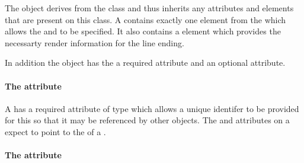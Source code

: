 The \LineEnding object derives from the \GraphicalPrimitiveTwoD class
and thus inherits any attributes and elements that are present on this
class.
A \LineEnding contains exactly one  element from the \LayoutPackage which allows the  and  to be specified. It also contains a \RenderGroup element which provides the necessarty render information for the line ending.
  
In addition the \LineEnding object has the a required  attribute and an optional  attribute.

\paragraph{The \fixttspace{} attribute}

A \LineEnding has a required attribute  of type
 which allows a unique identifer to be provided for this \LineEnding so that it may be referenced by other objects. The  and  attributes on a \RenderCurve expect to point to the  of a \LineEnding.

\paragraph{The \fixttspace{} attribute}

